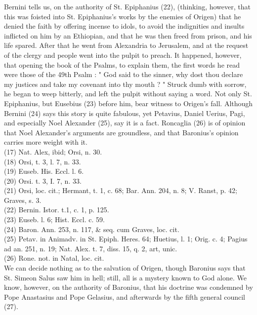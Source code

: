\documentclass[12pt]{book}
\begin{document}
Bernini tells us, on the authority of St. Epiphanius (22), (thinking, however, that this was foisted into St.
Epiphanius’s works by the enemies of Origen) that he denied the faith by offering incense to idols, to
avoid the indignities and insults inflicted on him by an Ethiopian, and that he was then freed from
prison, and his life spared. After that he went from Alexandria to Jerusalem, and at the request of the
clergy and people went into the pulpit to preach. It happened, however, that opening the book of the
Psalms, to explain them, the first words he read were those of the 49th Psalm : " God said to the sinner,
why dost thou declare my justices and take my covenant into thy mouth ? " Struck dumb with sorrow, he
began to weep bitterly, and left the pulpit without saying a word. Not only St. Epiphanius, but Eusebius
(23) before him, bear witness to Origen’s fall. Although Bernini (24) says this story is quite fabulous, yet 
Petavius, Daniel Uerius, Pagi, and especially Noel Alexander (25), say it is a fact. Roncaglia (26) is of
opinion that Noel Alexander’s arguments are groundless, and that Baronius’s opinion carries more
weight with it.\\
(17) Nat. Alex, ibid; Orsi, n. 30.\\
(18) Orsi, t. 3, l. 7, n. 33. \\
(19) Euseb. His. Eccl. l. 6. \\
(20) Orsi. t. 3, I. 7, n. 33.\\
(21) Orsi, loc. cit.; Hermant, t. 1, c. 68; Bar. Ann. 204, n. 8; V. Ranst, p. 42; Graves, s. 3. \\
(22) Bernin. Istor. t.1, c. 1, p. 125. \\
(23) Euseb. l. 6; Hist. Eccl. c. 59.\\
(24) Baron. Ann. 253, n. 117, \& seq. cum Graves, loc. cit. \\
(25) Petav. in Animadv. in St. Epiph. Heres. 64; Huetius, l. 1; Orig. c. 4; Pagius ad an. 251, n. 19; Nat. Alex. t. 7, diss. 15, q. 2, art, unic. \\
(26) Rone. not. in Natal, loc. cit. \\

We can decide nothing as to the salvation of Origen, though Baronius says that St. Simeon Salus saw him
in hell; still, all is a mystery known to God alone. We know, however, on the authority of Baronius, that
his doctrine was condemned by Pope Anastasius and Pope Gelasius, and afterwards by the fifth general
council (27).
\end{document}
